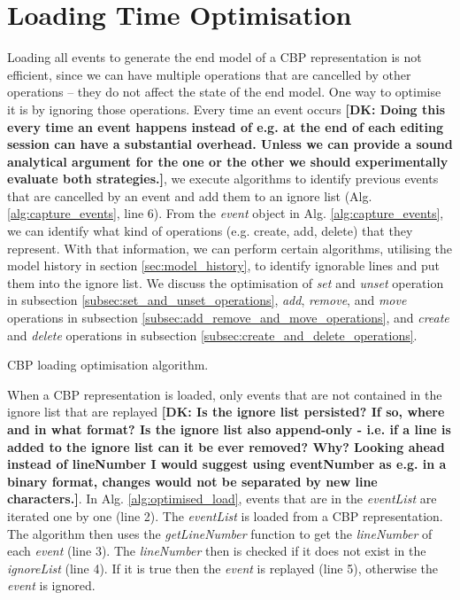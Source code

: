 \documentclass[sigconf]{acmart}
\newcommand{\dk}[1]{\textbf{[DK: #1]}}
\begin{document}
\section{Loading Time Optimisation}
\label{sec:loading_time_optimisation}
Loading all events to generate the end model of a CBP representation is not efficient, since we can have multiple operations that are cancelled by other operations -- they do not affect the state of the end model. One way to optimise it is by ignoring those operations. Every time an event occurs \dk{Doing this every time an event happens instead of e.g. at the end of each editing session can have a substantial overhead. Unless we can provide a sound analytical argument for the one or the other we should experimentally evaluate both strategies.}, we execute algorithms to identify previous events that are cancelled by an event and add them to an ignore list (Alg. \ref{alg:capture_events}, line 6). From the \emph{event} object in Alg. \ref{alg:capture_events}, we can identify what kind of  operations (e.g. create, add, delete) that they represent. With that information, we can perform certain algorithms, utilising the model history in section \ref{sec:model_history}, to identify ignorable lines and put them into the ignore list. We discuss the optimisation of \emph{set} and \emph{unset} operation in subsection \ref{subsec:set_and_unset_operations}, \emph{add}, \emph{remove}, and \emph{move} operations in subsection \ref{subsec:add_remove_and_move_operations}, and \emph{create} and \emph{delete} operations in subsection \ref{subsec:create_and_delete_operations}.

\begin{algorithm}
\caption{CBP loading optimisation algorithm.}
\label{alg:optimised_load}
\end{algorithm}

When a CBP representation is loaded, only events that are not contained in the ignore list that are replayed \dk{Is the ignore list persisted? If so, where and in what format? Is the ignore list also append-only - i.e. if a line is added to the ignore list can it be ever removed? Why? Looking ahead instead of lineNumber I would suggest using eventNumber as e.g. in a binary format, changes would not be separated by new line characters.}. In Alg. \ref{alg:optimised_load}, events that are in the \emph{eventList} are iterated one by one (line 2). The \emph{eventList} is loaded from a CBP representation. The algorithm then uses the \emph{getLineNumber} function to get the \emph{lineNumber} of each \emph{event} (line 3). The \emph{lineNumber} then is checked if it does not exist in the \emph{ignoreList} (line 4). If it is true then the \emph{event} is replayed (line 5), otherwise the \emph{event} is ignored.   
\end{document}
